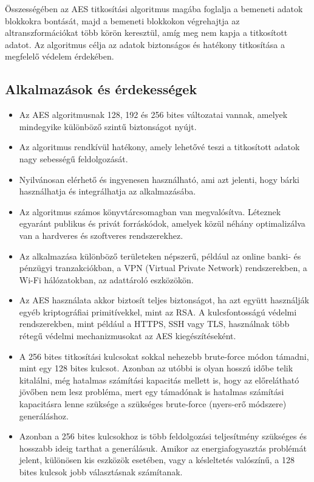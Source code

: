 Összességében az AES titkosítási algoritmus magába foglalja a bemeneti adatok blokkokra bontását, majd a bemeneti blokkokon végrehajtja az altranszformációkat több körön keresztül, amíg meg nem kapja a titkosított adatot. Az algoritmus célja az adatok biztonságos és hatékony titkosítása a megfelelő védelem érdekében.

\subsection{Alkalmazások és érdekességek}

\begin{itemize}
	\item Az AES algoritmusnak 128, 192 és 256 bites változatai vannak, amelyek mindegyike különböző szintű biztonságot nyújt.
	\item Az algoritmus rendkívül hatékony, amely lehetővé teszi a titkosított adatok nagy sebességű feldolgozását.
	\item Nyilvánosan elérhető és ingyenesen használható, ami azt jelenti, hogy bárki használhatja és integrálhatja az alkalmazásába.
	\item Az algoritmus számos könyvtárcsomagban van megvalósítva. Léteznek egyaránt publikus és privát forráskódok, amelyek közül néhány optimalizálva van a hardveres és szoftveres rendszerekhez.
	\item Az alkalmazása különböző területeken népszerű, például az online banki- és pénzügyi tranzakciókban, a VPN (Virtual Private Network) rendszerekben, a Wi-Fi hálózatokban, az adattároló eszközökön.
	\item Az AES használata akkor biztosít teljes biztonságot, ha azt együtt használják egyéb kriptográfiai primitívekkel, mint az RSA. A kulcsfontosságú védelmi rendszerekben, mint például a HTTPS, SSH vagy TLS, használnak több rétegű védelmi mechanizmusokat az AES kiegészítéseként.
	\item A 256 bites titkosítási kulcsokat sokkal nehezebb brute-force módon támadni, mint egy 128 bites kulcsot. Azonban az utóbbi is olyan hosszú időbe telik kitalálni, még hatalmas számítási kapacitás mellett is, hogy az előrelátható jövőben nem lesz probléma, mert egy támadónak is hatalmas számítási kapacitásra lenne szüksége a szükséges brute-force (nyers-erő módszere) generáláshoz.
	\item Azonban a 256 bites kulcsokhoz is több feldolgozási teljesítmény szükséges és hosszabb ideig tarthat a generálásuk. Amikor az energiafogyasztás problémát jelent, különösen kis eszközök esetében, vagy a késleltetés valószínű, a 128 bites kulcsok jobb választásnak számítanak.
\end{itemize}

